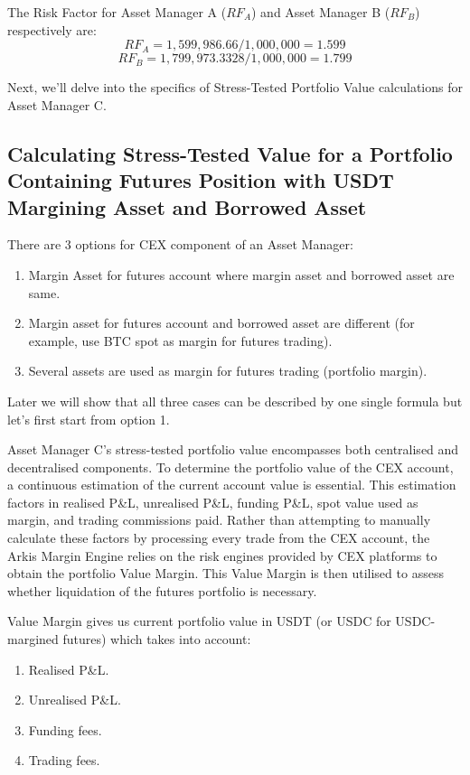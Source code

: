 \documentclass[conference]{IEEEtran}
\begin{document}
The Risk Factor for Asset Manager A ($RF_{A}$) and Asset Manager B ($RF_{B}$) respectively are:
$$RF_{A} = 1,599,986.66/1,000,000=1.599$$
$$RF_{B} = 1,799,973.3328​/1,000,000=1.799$$

Next, we'll delve into the specifics of Stress-Tested Portfolio Value calculations for Asset Manager C.

\subsection{Calculating Stress-Tested Value for a Portfolio Containing Futures Position with USDT Margining Asset and Borrowed Asset}

There are 3 options for CEX component of an Asset Manager:
\begin{enumerate}
	\item Margin Asset for futures account where margin asset and borrowed asset are same. 
	\item Margin asset for futures account and borrowed asset are different (for example, use BTC spot as margin for futures trading).
	\item Several assets are used as margin for futures trading (portfolio margin). 
\end{enumerate}

Later we will show that all three cases can be described by one single formula but let's first start from option 1.

Asset Manager C's stress-tested portfolio value encompasses both centralised and decentralised components. To determine the portfolio value of the CEX account, a continuous estimation of the current account value is essential. This estimation factors in realised P\&L, unrealised P\&L, funding P\&L, spot value used as margin, and trading commissions paid. Rather than attempting to manually calculate these factors by processing every trade from the CEX account, the Arkis Margin Engine relies on the risk engines provided by CEX platforms to obtain the portfolio Value Margin. This Value Margin is then utilised to assess whether liquidation of the futures portfolio is necessary.


Value Margin gives us current portfolio value in USDT (or USDC for USDC-margined futures) which takes into account:
\begin{enumerate}
	\item Realised P\&L.
	\item Unrealised P\&L.
	\item Funding fees.
	\item Trading fees.
\end{enumerate}
\end{document}

